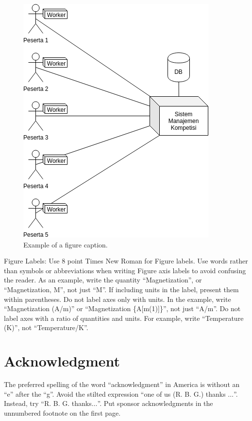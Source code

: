 \documentclass[conference]{IEEEtran}
\begin{document}
\begin{figure}[htbp]
\centerline{\includegraphics{images/architecture-new.png}}
\caption{Example of a figure caption.}
\label{fig}
\end{figure}

Figure Labels: Use 8 point Times New Roman for Figure labels. Use words 
rather than symbols or abbreviations when writing Figure axis labels to 
avoid confusing the reader. As an example, write the quantity 
``Magnetization'', or ``Magnetization, M'', not just ``M''. If including 
units in the label, present them within parentheses. Do not label axes only 
with units. In the example, write ``Magnetization (A/m)'' or ``Magnetization 
\{A[m(1)]\}'', not just ``A/m''. Do not label axes with a ratio of 
quantities and units. For example, write ``Temperature (K)'', not 
``Temperature/K''.

\section*{Acknowledgment}

The preferred spelling of the word ``acknowledgment'' in America is without 
an ``e'' after the ``g''. Avoid the stilted expression ``one of us (R. B. 
G.) thanks $\ldots$''. Instead, try ``R. B. G. thanks$\ldots$''. Put sponsor 
acknowledgments in the unnumbered footnote on the first page.
\end{document}
